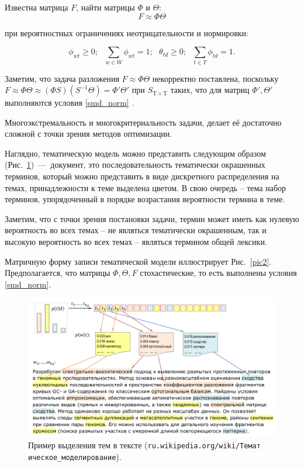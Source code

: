 \documentclass[a4paper, 14pt]{extarticle}
\begin{document}
   	Известна матрица $F$, найти матрицы $\Phi$ и $\Theta$:
   	\begin{equation}
   		F \approx \Phi \Theta
    \label{tmtask}
    \end{equation}
    	
    при вероятностных ограничениях неотрицательности и нормировки:
    
    \begin{equation}
    \phi_{wt} \geq 0;~~~\sum_{w \in W} \phi_{wt} = 1;~~~\theta_{td} \geq 0;~~~\sum_{t \in T} \phi_{td} = 1.
    \label{smd_norm}
    \end{equation}

    Заметим, что задача разложения $F \approx \Phi\Theta$ некорректно поставлена, поскольку $F \approx \Phi\Theta \approx (\Phi S) (S^{-1}\Theta ) = \Phi'\Theta'$ при $S_{\mathrm{T} \times \mathrm{T}}$ таких, что для матриц $\Phi', \Theta'$ выполняются условия \ref{smd_norm} \cite{Voron15slides}.
    
    Многоэкстремальность и многокритериальность задачи, делает её достаточно сложной с точки зрения методов оптимизации.

   	Наглядно, тематическую модель можно представить следующим образом (Рис.~\ref{pic1})~---~документ, это последовательность тематически окрашенных терминов, который можно представить в виде дискретного распределения на темах, принадлежности к теме выделена цветом. В свою очередь -- тема набор терминов, упорядоченный в порядке возрастания вероятности термина в теме. 
   	
   	Заметим, что с точки зрения постановки задачи, термин может иметь как нулевую вероятность во всех темах -- не являться тематически окрашенным, так и высокую вероятность во всех темах -- являться термином общей лексики.
   	
   	Матричную форму записи тематической модели иллюстрирует Рис.~\ref{pic2}. Предполагается, что матрицы $\Phi, \Theta, F$ стохастические, то есть выполнены условия \ref{smd_norm}.  

	\begin{figure}
			\centering \includegraphics[scale=0.45]{img/te} 
			\caption{Пример выделения тем в тексте (\texttt{ru.wikipedia.org/wiki/Темат
			ическое\_моделирование}).}
			\label{pic1}
	\end{figure}
\end{document}
